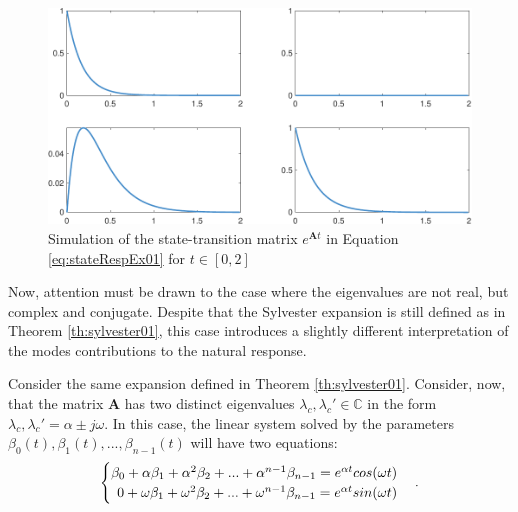 \documentclass[a4paper,11pt]{book}
\numberwithin{figure}{chapter}
\numberwithin{equation}{chapter}
\numberwithin{table}{chapter}
\newtheorem{theorem}{Theorem}[chapter]
\theoremstyle{definition}
\newcounter{boxed-theorem}
\newenvironment{boxed-theorem}[1]
{\begin{shaded} \begin{theorem}{#1}}
{\end{theorem} \end{shaded}}
\newcounter{boxed-definition}
\begin{document}
\begin{figure}[ht]
    \centering
    \includegraphics[width=\textwidth]{chapter2/stateTrans01}
    \caption{Simulation of the state-transition matrix $e^{\bm{A} t}$ in Equation \eqref{eq:stateRespEx01} for $t \in [0,2]$}
    \label{fig:stateTrans01}
\end{figure}

Now, attention must be drawn to the case where the eigenvalues are not real, but complex and conjugate. Despite that the Sylvester expansion is still defined as in Theorem \ref{th:sylvester01}, this case introduces a slightly different interpretation of the modes contributions to the natural response.

\begin{boxed-theorem}{} \label{th:sylvester02}
    Consider the same expansion defined in Theorem \ref{th:sylvester01}. Consider, now, that the matrix $\bm{A}$ has two distinct eigenvalues $\lambda_c, \lambda_c' \in \mathbb{C}$ in the form $\lambda_c, \lambda_c' = \alpha \pm j \omega$. In this case, the linear system solved by the parameters $\beta_0(t), \beta_1(t), ..., \beta_{n-1}(t)$ will have two equations:
    \begin{align} \label{eq:sylvEq01}
    \begin{cases}
        \beta_0 + \alpha \beta_1 + \alpha^{2} \beta_2 + ... + \alpha^{n-1} \beta_{n-1} = e^{\alpha t} cos(\omega t) & \\
        \hfill 0 + \omega \beta_1 + \omega^{2} \beta_2 + ... + \omega^{n-1} \beta_{n-1} = e^{\alpha t} sin(\omega t) &
    \end{cases}
    .\end{align}
\end{boxed-theorem}
\end{document}
